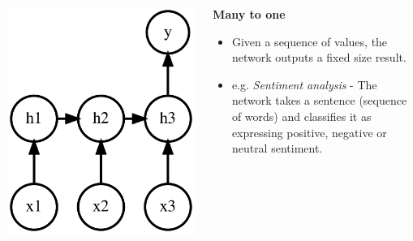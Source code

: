 \documentclass{beamer}
\begin{document}
\begin{frame}[allowframebreaks]
\begin{columns}
  \end{columns}
  \framebreak
  \begin{columns}
    \begin{column}{0.3\textwidth}
      \includegraphics[height=0.5\textheight]{../img/many-to-one.png}
    \end{column}
    \begin{column}{0.7\textwidth}
      \begin{center}
        \textbf{Many to one}
      \end{center}
      \begin{itemize}
        \item Given a sequence of values, the network outputs a fixed size result.
        \item e.g. \textit{Sentiment analysis} - The network takes a sentence (sequence of words) and classifies it as expressing positive, negative or neutral sentiment.
      \end{itemize}
    \end{column}
  \end{columns}
  \framebreak
  \begin{columns}

\end{columns}
\end{frame}
\end{document}
